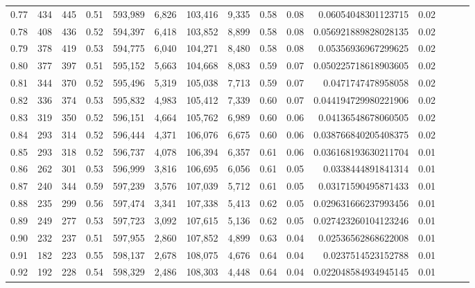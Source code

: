 \begin{tabular}{rrrrrrrrrrrrrrr}
0.77 &     434 &    445 &  0.51 &  593,989 &    6,826 &  103,416 &    9,335 &  0.58 &  0.08 &   0.06054048301123715 &      0.02 \\
0.78 &     408 &    436 &  0.52 &  594,397 &    6,418 &  103,852 &    8,899 &  0.58 &  0.08 &  0.056921889828028135 &      0.02 \\
0.79 &     378 &    419 &  0.53 &  594,775 &    6,040 &  104,271 &    8,480 &  0.58 &  0.08 &   0.05356936967299625 &      0.02 \\
0.80 &     377 &    397 &  0.51 &  595,152 &    5,663 &  104,668 &    8,083 &  0.59 &  0.07 &  0.050225718618903605 &      0.02 \\
0.81 &     344 &    370 &  0.52 &  595,496 &    5,319 &  105,038 &    7,713 &  0.59 &  0.07 &    0.0471747478958058 &      0.02 \\
0.82 &     336 &    374 &  0.53 &  595,832 &    4,983 &  105,412 &    7,339 &  0.60 &  0.07 &  0.044194729980221906 &      0.02 \\
0.83 &     319 &    350 &  0.52 &  596,151 &    4,664 &  105,762 &    6,989 &  0.60 &  0.06 &   0.04136548678060505 &      0.02 \\
0.84 &     293 &    314 &  0.52 &  596,444 &    4,371 &  106,076 &    6,675 &  0.60 &  0.06 &  0.038766840205408375 &      0.02 \\
0.85 &     293 &    318 &  0.52 &  596,737 &    4,078 &  106,394 &    6,357 &  0.61 &  0.06 &  0.036168193630211704 &      0.01 \\
0.86 &     262 &    301 &  0.53 &  596,999 &    3,816 &  106,695 &    6,056 &  0.61 &  0.05 &    0.0338444891841314 &      0.01 \\
0.87 &     240 &    344 &  0.59 &  597,239 &    3,576 &  107,039 &    5,712 &  0.61 &  0.05 &   0.03171590495871433 &      0.01 \\
0.88 &     235 &    299 &  0.56 &  597,474 &    3,341 &  107,338 &    5,413 &  0.62 &  0.05 &  0.029631666237993456 &      0.01 \\
0.89 &     249 &    277 &  0.53 &  597,723 &    3,092 &  107,615 &    5,136 &  0.62 &  0.05 &  0.027423260104123246 &      0.01 \\
0.90 &     232 &    237 &  0.51 &  597,955 &    2,860 &  107,852 &    4,899 &  0.63 &  0.04 &   0.02536562868622008 &      0.01 \\
0.91 &     182 &    223 &  0.55 &  598,137 &    2,678 &  108,075 &    4,676 &  0.64 &  0.04 &    0.0237514523152788 &      0.01 \\
0.92 &     192 &    228 &  0.54 &  598,329 &    2,486 &  108,303 &    4,448 &  0.64 &  0.04 &  0.022048584934945145 &      0.01 \\

\end{tabular}
